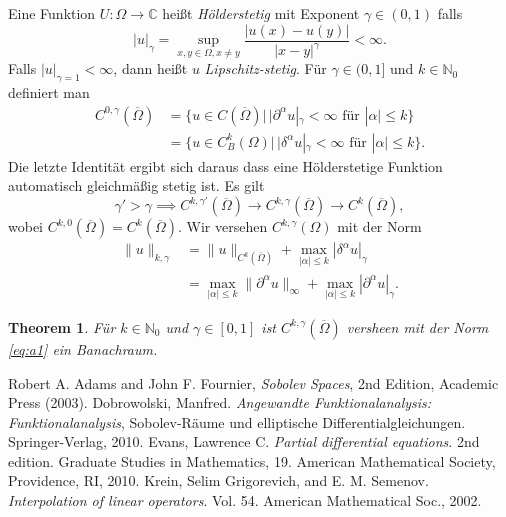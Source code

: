 \documentclass[
paper=a4,
bibtotocnumbered,
liststotocnumbered,
tablecaptionabove,
pointlessnumbers,
twoside,
openright,
10pt
]
{report}
\newtheorem{thm}{Theorem}[chapter]
\theoremstyle{definition}
\numberwithin{equation}{chapter}
\begin{document}
Eine Funktion $U: \Omega \to \mathbb C$ heißt \emph{Hölderstetig} mit Exponent $\gamma \in (0,1)$ falls
\begin{equation}
|u|_\gamma = \sup_{x,y \in \Omega, x\neq y} \frac{|u(x)-u(y)|}{|x-y|^\gamma} < \infty.
\end{equation}
Falls $|u|_{\gamma=1} <\infty$, dann heißt $u$ \emph{Lipschitz-stetig}. Für $\gamma \in (0,1]$ und $k\in \mathbb N_0$ definiert man
\begin{align*}
C^{0,\gamma}(\overline{\Omega}) &= \{ u\in C(\overline{\Omega}) |\, |\partial^\alpha u|_\gamma <\infty \text{ für } |\alpha|\le k\}\\
&= \{u\in C_B^k(\Omega) | \, |\delta^\alpha u|_\gamma <\infty \text{ für } |\alpha|\le k\}.
\end{align*}
Die letzte Identität ergibt sich daraus dass eine Hölderstetige Funktion automatisch gleichmäßig stetig ist. Es gilt
\begin{equation}
\gamma' >\gamma \implies C^{k,\gamma'}(\overline{\Omega}) \to C^{k,\gamma}(\overline{\Omega}) \to C^k(\overline{\Omega}),
\end{equation}
wobei $C^{k,0}(\overline{\Omega}) = C^k(\overline{\Omega})$. Wir versehen $C^{k,\gamma}(\Omega)$ mit der Norm
\begin{equation}\label{eq:a1}
\begin{split}
\| u\|_{k,\gamma} &= \| u\|_{C^k(\overline{\Omega})} + \max_{|\alpha|\le k} |\delta^\alpha u|_\gamma\\
&= \max_{|\alpha|\le k} \| \partial^\alpha u\|_\infty + \max_{|\alpha|\le k} |\partial^\alpha u|_\gamma. 
\end{split}
\end{equation}
\begin{thm}
Für $k\in \mathbb N_0$ und $\gamma \in [0,1]$ ist $C^{k,\gamma}(\overline{\Omega})$ versheen mit der Norm \eqref{eq:a1} ein Banachraum.
\end{thm}
\begin{thebibliography}{xxx}
 Robert A. Adams and John F.  Fournier, \textit{Sobolev Spaces}, 2nd Edition, Academic Press (2003).
 Dobrowolski, Manfred. \textit{Angewandte Funktionalanalysis: Funktionalanalysis}, Sobolev-Räume und elliptische Differentialgleichungen. Springer-Verlag, 2010.
 Evans, Lawrence C.
\textit{Partial differential equations}. 
2nd edition. Graduate Studies in Mathematics, 19. American Mathematical Society, Providence, RI, 2010.
 Krein, Selim Grigorevich, and E. M. Semenov. \textit{Interpolation of linear operators}. Vol. 54. American Mathematical Soc., 2002.
\end{thebibliography}
\end{document}
